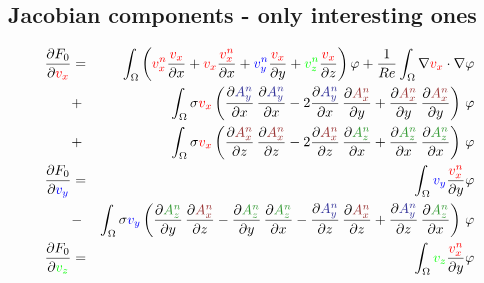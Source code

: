 \documentclass[smallextended]{svjour3}       %
\begin{document}
		\subsection{Jacobian components - only interesting ones}
		\begin{eqnarray}
		\frac{\partial F_0}{\partial \textcolor{red}{v_x}} & = &
		\int_{\Omega} \left(\textcolor{red}{v_x^n} \frac{\textcolor{red}{v_x}}{\partial x} + \textcolor{red}{v_x} \frac{\textcolor{red}{v_x^n}}{\partial x} + \textcolor{blu}{v_y^n} \frac{\textcolor{red}{v_x}}{\partial y} + \textcolor{gre}{v_z^n} \frac{\textcolor{red}{v_x}}{\partial z}\right) \varphi
			+ \frac{1}{Re} \int_{\Omega} \nabla \textcolor{red}{v_x} \cdot \nabla \varphi \nonumber \\
			& + & \int_{\Omega} \sigma \textcolor{red}{v_x} \left(\frac{\partial \textcolor{darkblu}{A_y^n}}{\partial x}\,\frac{\partial \textcolor{darkblu}{A_y^n}}{\partial x} - 2 \frac{\partial \textcolor{darkblu}{A_y^n}}{\partial x}\,\frac{\partial \textcolor{darkred}{A_x^n}}{\partial y} + \frac{\partial \textcolor{darkred}{A_x^n}}{\partial y}\,\frac{\partial \textcolor{darkred}{A_x^n}}{\partial y} \right)\, \varphi \nonumber \\				
			& + & \int_{\Omega} \sigma \textcolor{red}{v_x} \left(\frac{\partial \textcolor{darkred}{A_x^n}}{\partial z}\,\frac{\partial \textcolor{darkred}{A_x^n}}{\partial z} - 2 \frac{\partial \textcolor{darkred}{A_x^n}}{\partial z}\,\frac{\partial \textcolor{darkgre}{A_z^n}}{\partial x} + \frac{\partial \textcolor{darkgre}{A_z^n}}{\partial x}\,\frac{\partial \textcolor{darkgre}{A_z^n}}{\partial x} \right)\, \varphi \\
			\frac{\partial F_0}{\partial \textcolor{blu}{v_y}} & = &
		\int_{\Omega} \textcolor{blu}{v_y} \frac{\textcolor{red}{v_x^n}}{\partial y} \varphi \nonumber  \\		
			& - & \int_{\Omega} \sigma \textcolor{blu}{v_y} \left(\frac{\partial \textcolor{darkgre}{A_z^n}}{\partial y}\,\frac{\partial \textcolor{darkred}{A_x^n}}{\partial z} - \frac{\partial \textcolor{darkgre}{A_z^n}}{\partial y}\,\frac{\partial \textcolor{darkgre}{A_z^n}}{\partial x} - \frac{\partial \textcolor{darkblu}{A_y^n}}{\partial z}\,\frac{\partial \textcolor{darkred}{A_x^n}}{\partial z}  + \frac{\partial \textcolor{darkblu}{A_y^n}}{\partial z}\,\frac{\partial \textcolor{darkgre}{A_z^n}}{\partial x} \right)\, \varphi \\			
			\frac{\partial F_0}{\partial \textcolor{gre}{v_z}} & = &
		\int_{\Omega} \textcolor{gre}{v_z} \frac{\textcolor{red}{v_x^n}}{\partial y} \varphi

\end{eqnarray}
\end{document}
